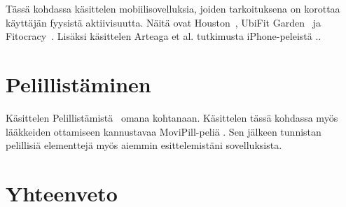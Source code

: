 \documentclass[finnish]{tktltiki2}
\theoremstyle{definition}
\theoremstyle{remark}
\begin{document}
Tässä kohdassa käsittelen mobiilisovelluksia, joiden tarkoituksena on korottaa käyttäjän fyysistä aktiivisuutta. Näitä ovat Houston~\cite{houston}, UbiFit Garden~\cite{ubifit} ja Fitocracy~\cite{fitocracy}. Lisäksi käsittelen Arteaga et al. tutkimusta iPhone-peleistä \cite{obesity}..

\section{Pelillistäminen}

Käsittelen Pelillistämistä~\cite{gamification} omana kohtanaan. Käsittelen tässä kohdassa myös lääkkeiden ottamiseen kannustavaa MoviPill-peliä \cite{movipill}.
Sen jälkeen tunnistan pelillisiä elementtejä myös aiemmin esittelemistäni sovelluksista.

\section{Yhteenveto}

%
%
% 
%







% 
\end{document}
